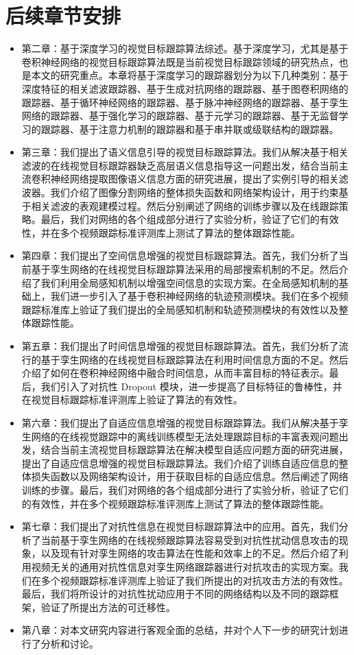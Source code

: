 \section{后续章节安排}
\begin{itemize}
\item 第二章：基于深度学习的视觉目标跟踪算法综述。基于深度学习，尤其是基于卷积神经网络的视觉目标跟踪算法既是当前视觉目标跟踪领域的研究热点，也是本文的研究重点。本章将基于深度学习的跟踪器划分为以下几种类别：基于深度特征的相关滤波跟踪器、基于生成对抗网络的跟踪器、基于图卷积网络的跟踪器、基于循环神经网络的跟踪器、基于脉冲神经网络的跟踪器、基于孪生网络的跟踪器、基于强化学习的跟踪器、基于元学习的跟踪器、基于无监督学习的跟踪器、基于注意力机制的跟踪器和基于串并联或级联结构的跟踪器。
\item 第三章：我们提出了语义信息引导的视觉目标跟踪算法。我们从解决基于相关滤波的在线视觉目标跟踪器缺乏高层语义信息指导这一问题出发，结合当前主流卷积神经网络提取图像语义信息方面的研究进展，提出了实例引导的相关滤波器。我们介绍了图像分割网络的整体损失函数和网络架构设计，用于约束基于相关滤波的表观建模过程。然后分别阐述了网络的训练步骤以及在线跟踪策略。最后，我们对网络的各个组成部分进行了实验分析，验证了它们的有效性，并在多个视频跟踪标准评测库上测试了算法的整体跟踪性能。%
\item 第四章：我们提出了空间信息增强的视觉目标跟踪算法。首先，我们分析了当前基于孪生网络的在线视觉目标跟踪算法采用的局部搜索机制的不足。然后介绍了我们利用全局感知机制以增强空间信息的实现方案。在全局感知机制的基础上，我们进一步引入了基于卷积神经网络的轨迹预测模块。我们在多个视频跟踪标准库上验证了我们提出的全局感知机制和轨迹预测模块的有效性以及整体跟踪性能。
\item 第五章：我们提出了时间信息增强的视觉目标跟踪算法。首先，我们分析了流行的基于孪生网络的在线视觉目标跟踪算法在利用时间信息方面的不足。然后介绍了如何在卷积神经网络中融合时间信息，从而丰富目标的特征表示。最后，我们引入了对抗性 Dropout 模块，进一步提高了目标特征的鲁棒性，并在视觉目标跟踪标准评测库上验证了算法的有效性。
\item 第六章：我们提出了自适应信息增强的视觉目标跟踪算法。我们从解决基于孪生网络的在线视觉跟踪中的离线训练模型无法处理跟踪目标的丰富表观问题出发，结合当前主流视觉目标跟踪算法在解决模型自适应问题方面的研究进展，提出了自适应信息增强的视觉目标跟踪算法。我们介绍了训练自适应信息的整体损失函数以及网络架构设计，用于获取目标的自适应信息。然后阐述了网络训练的步骤。最后，我们对网络的各个组成部分进行了实验分析，验证了它们的有效性，并在多个视频跟踪标准评测库上测试了算法的整体跟踪性能。
\item 第七章：我们提出了对抗性信息在视觉目标跟踪算法中的应用。首先，我们分析了当前基于孪生网络的在线视频跟踪算法容易受到对抗性扰动信息攻击的现象，以及现有针对孪生网络的攻击算法在性能和效率上的不足。然后介绍了利用视频无关的通用对抗性信息对孪生网络跟踪器进行对抗攻击的实现方案。我们在多个视频跟踪标准评测库上验证了我们所提出的对抗攻击方法的有效性。最后，我们将所设计的对抗性扰动应用于不同的网络结构以及不同的跟踪框架，验证了所提出方法的可迁移性。
\item 第八章：对本文研究内容进行客观全面的总结，并对个人下一步的研究计划进行了分析和讨论。
\end{itemize}